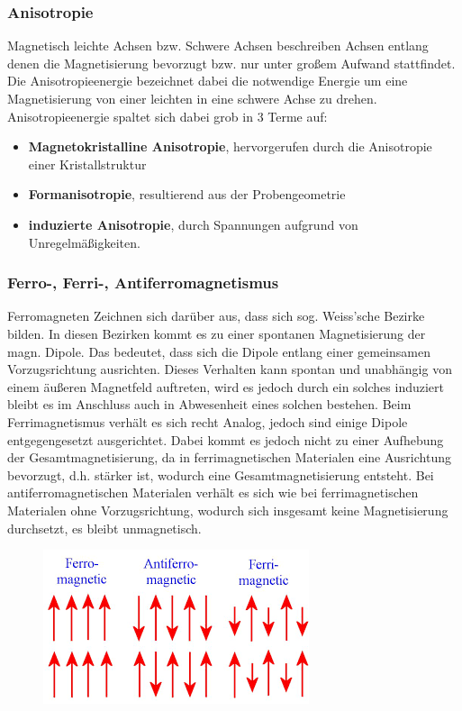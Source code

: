         \subsubsection*{Anisotropie}
            Magnetisch leichte Achsen bzw. Schwere Achsen beschreiben Achsen entlang denen die Magnetisierung bevorzugt
            bzw. nur unter großem Aufwand stattfindet. Die Anisotropieenergie bezeichnet dabei die notwendige Energie
            um eine Magnetisierung von einer leichten in eine schwere Achse zu drehen.\\
            Anisotropieenergie spaltet sich dabei grob in 3 Terme auf:
            \begin{itemize}
                \item \textbf{Magnetokristalline Anisotropie}, hervorgerufen durch die Anisotropie einer Kristallstruktur
                \item \textbf{Formanisotropie}, resultierend aus der Probengeometrie
                \item \textbf{induzierte Anisotropie}, durch Spannungen aufgrund von Unregelmäßigkeiten.
            \end{itemize}
        \subsubsection*{Ferro-, Ferri-, Antiferromagnetismus}
            Ferromagneten Zeichnen sich darüber aus, dass sich sog. Weiss'sche Bezirke bilden. In diesen Bezirken
            kommt es zu einer spontanen Magnetisierung der magn. Dipole. Das bedeutet, dass sich die Dipole entlang einer
            gemeinsamen Vorzugsrichtung ausrichten. Dieses Verhalten kann spontan und unabhängig von einem äußeren Magnetfeld
            auftreten, wird es jedoch durch ein solches induziert bleibt es im Anschluss auch in Abwesenheit eines solchen bestehen.
            Beim Ferrimagnetismus verhält es sich recht Analog, jedoch sind einige Dipole entgegengesetzt ausgerichtet.
            Dabei kommt es jedoch nicht zu einer Aufhebung der Gesamtmagnetisierung, da in ferrimagnetischen Materialen
            eine Ausrichtung bevorzugt, d.h. stärker ist, wodurch eine Gesamtmagnetisierung entsteht.
            Bei antiferromagnetischen Materialen verhält es sich wie bei ferrimagnetischen Materialen ohne Vorzugsrichtung,
            wodurch sich insgesamt keine Magnetisierung durchsetzt, es bleibt unmagnetisch.
            \begin{figure}[H]
                \centering
                \includegraphics{Images/ferroferrianti.png}
            \end{figure}
